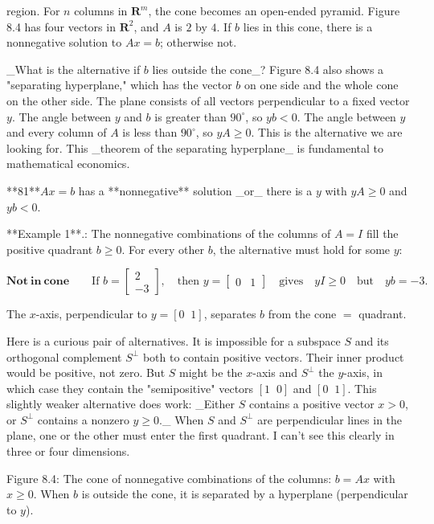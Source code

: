 region. For \(n\) columns in \(\mathbf{R}^{m}\), the cone becomes an open-ended pyramid. Figure 8.4 has four vectors in \(\mathbf{R}^{2}\), and \(A\) is \(2\) by \(4\). If \(b\) lies in this cone, there is a nonnegative solution to \(Ax=b\); otherwise not.

_What is the alternative if \(b\) lies outside the cone_? Figure 8.4 also shows a "separating hyperplane," which has the vector \(b\) on one side and the whole cone on the other side. The plane consists of all vectors perpendicular to a fixed vector \(y\). The angle between \(y\) and \(b\) is greater than \(90^{\circ}\), so \(yb<0\). The angle between \(y\) and every column of \(A\) is less than \(90^{\circ}\), so \(yA\geq 0\). This is the alternative we are looking for. This _theorem of the separating hyperplane_ is fundamental to mathematical economics.

**81**\(Ax=b\) has a **nonnegative** solution _or_ there is a \(y\) with \(yA\geq 0\) and \(yb<0\).

**Example 1**.: The nonnegative combinations of the columns of \(A=I\) fill the positive quadrant \(b\geq 0\). For every other \(b\), the alternative must hold for some \(y\):

\[\mathbf{Not\ in\ cone}\qquad\text{If }b=\begin{bmatrix}2\\ -3\end{bmatrix},\quad\text{then }y=\begin{bmatrix}0&1\end{bmatrix} \quad\text{gives}\quad yI\geq 0\quad\text{but}\quad yb=-3.\]

The \(x\)-axis, perpendicular to \(y=[0\;\;1]\), separates \(b\) from the cone \(=\) quadrant.

Here is a curious pair of alternatives. It is impossible for a subspace \(S\) and its orthogonal complement \(S^{\perp}\) both to contain positive vectors. Their inner product would be positive, not zero. But \(S\) might be the \(x\)-axis and \(S^{\perp}\) the \(y\)-axis, in which case they contain the "semipositive" vectors \([1\;\;0]\) and \([0\;\;1]\). This slightly weaker alternative does work: _Either \(S\) contains a positive vector \(x>0\), or \(S^{\perp}\) contains a nonzero \(y\geq 0\)._ When \(S\) and \(S^{\perp}\) are perpendicular lines in the plane, one or the other must enter the first quadrant. I can't see this clearly in three or four dimensions.

Figure 8.4: The cone of nonnegative combinations of the columns: \(b=Ax\) with \(x\geq 0\). When \(b\) is outside the cone, it is separated by a hyperplane (perpendicular to \(y\)).

 